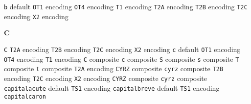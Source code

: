 \documentclass[twoside]{ltxdoc}
\makeatletter
\renewenvironment{theindex}{%
   \@restonecoltrue
   \if@twocolumn\@restonecolfalse\fi
   \columnseprule \z@
   \columnsep 35\p@
   \twocolumn[\index@prologue]%
   \IndexParms
   \let\item\@idxitem
   \ignorespaces
}{\if@restonecol\onecolumn\else\clearpage\fi}
\makeatother
\begin{document}
\begin{theindex}
  \item \texttt  {b}\efill 
    \subitem default\pfill {}
    \subitem \texttt  {OT1} encoding\pfill {}
    \subitem \texttt  {OT4} encoding\pfill {}
    \subitem \texttt  {T1} encoding\pfill {}
    \subitem \texttt  {T2A} encoding\pfill {}
    \subitem \texttt  {T2B} encoding\pfill {}
    \subitem \texttt  {T2C} encoding\pfill {}
    \subitem \texttt  {X2} encoding\pfill {}

  \indexspace
{\bfseries\hfil C\hfil}\nopagebreak

  \item \texttt  {C}\efill 
    \subitem \texttt  {T2A} encoding\pfill {}
    \subitem \texttt  {T2B} encoding\pfill {}
    \subitem \texttt  {T2C} encoding\pfill {}
    \subitem \texttt  {X2} encoding\pfill {}
  \item \texttt  {c}\efill 
    \subitem default\pfill {}
    \subitem \texttt  {OT1} encoding\pfill {}
    \subitem \texttt  {OT4} encoding\pfill {}
    \subitem \texttt  {T1} encoding\pfill {}
      \subsubitem \texttt  {C} composite\pfill {}
      \subsubitem \texttt  {c} composite\pfill {}
      \subsubitem \texttt  {S} composite\pfill {}
      \subsubitem \texttt  {s} composite\pfill {}
      \subsubitem \texttt  {T} composite\pfill {}
      \subsubitem \texttt  {t} composite\pfill {}
    \subitem \texttt  {T2A} encoding\pfill {}
      \subsubitem \texttt  {CYRZ} composite\pfill 
      \subsubitem \texttt  {cyrz} composite\pfill 
    \subitem \texttt  {T2B} encoding\pfill {}
    \subitem \texttt  {T2C} encoding\pfill {}
    \subitem \texttt  {X2} encoding\pfill {}
      \subsubitem \texttt  {CYRZ} composite\pfill 
      \subsubitem \texttt  {cyrz} composite\pfill 
  \item \texttt  {capitalacute}\efill 
    \subitem default\pfill {}
    \subitem \texttt  {TS1} encoding\pfill {}
  \item \texttt  {capitalbreve}\efill 
    \subitem default\pfill {}
    \subitem \texttt  {TS1} encoding\pfill {}
  \item \texttt  {capitalcaron}\efill 

\end{theindex}
\end{document}
